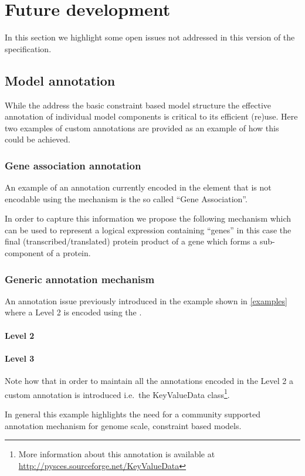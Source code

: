 
\section{Future development}
\label{future}

In this section we highlight some open issues not addressed in this version
of the \FBC specification.

\subsection{Model annotation}
While the \FBCPackage address the basic constraint based model structure the
effective annotation of individual model components is critical to its
efficient (re)use. Here two examples of custom annotations are provided as
an example of how this could be achieved.

\subsubsection{Gene association annotation}
An example of an annotation currently encoded in the \Notes element that is
not encodable using the \SBML \Annotation mechanism is the so called ``Gene
Association''.

In order to capture this information we propose the following mechanism
which can be used to represent a logical expression containing ``genes'' in
this case the final (transcribed/translated) protein product of a gene which
forms a sub-component of a protein.
%

\subsubsection{Generic annotation mechanism}
An annotation issue previously introduced in the example shown in
\ref{examples} where a \SBML Level 2 \Reaction is encoded using the
\FBCPackage.

\paragraph{\SBML Level 2 \Reaction}
%

\paragraph{\SBML Level 3 \Reaction}
Note how that in order to maintain all the annotations encoded in the \SBML
Level 2 \Reaction {} a custom annotation is introduced i.e.~the
\textsf{KeyValueData} class\footnote{More information about this annotation
is available at \url{http://pysces.sourceforge.net/KeyValueData}}.

In general this example highlights the need for a community supported
annotation mechanism for genome scale, constraint based models.
%
